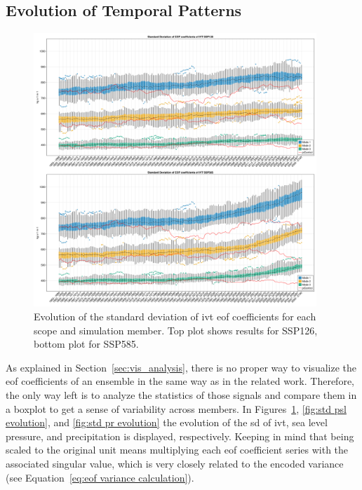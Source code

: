 \subsection{Evolution of Temporal Patterns}

\begin{figure}[!ht]
  \begin{center}
    \includegraphics[width=0.95\textwidth]{figures/std_ivt_50seasons_tempmodescale_3modes.png}
  \end{center}
  \caption[IVT SD Evolution]{Evolution of the standard deviation of \ac{ivt} \ac{eof} coefficients for each scope and simulation member. Top plot shows results for SSP126, bottom plot for SSP585.}
  \label{fig:std ivt evolution}
\end{figure}

As explained in Section~\ref{sec:vis_analysis}, there is no proper way to visualize the \ac{eof} coefficients of an ensemble in the same way as in the related work. 
Therefore, the only way left is to analyze the statistics of those signals and compare them in a boxplot to get a sense of variability across members. 
In Figures~\ref{fig:std ivt evolution}, \ref{fig:std psl evolution}, and \ref{fig:std pr evolution} the evolution of the \ac{sd} of \ac{ivt}, sea level pressure, and precipitation is displayed, respectively. 
Keeping in mind that being scaled to the original unit means multiplying each \ac{eof} coefficient series with the associated singular value, which is very closely related to the encoded variance (see Equation~\ref{eq:eof variance calculation}). 


